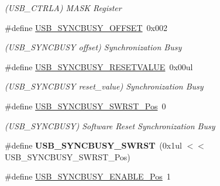 \begin{DoxyCompactItemize}
\begin{DoxyCompactList}\small\item\em (U\+S\+B\+\_\+\+C\+T\+R\+L\+A) M\+A\+S\+K Register \end{DoxyCompactList}\item 
\hypertarget{group___s_a_m_l21___u_s_b_gadc44c2e959eb4402df15e1d094e6978d}{}\#define \hyperlink{group___s_a_m_l21___u_s_b_gadc44c2e959eb4402df15e1d094e6978d}{U\+S\+B\+\_\+\+S\+Y\+N\+C\+B\+U\+S\+Y\+\_\+\+O\+F\+F\+S\+E\+T}~0x002\label{group___s_a_m_l21___u_s_b_gadc44c2e959eb4402df15e1d094e6978d}

\begin{DoxyCompactList}\small\item\em (U\+S\+B\+\_\+\+S\+Y\+N\+C\+B\+U\+S\+Y offset) Synchronization Busy \end{DoxyCompactList}\item 
\hypertarget{group___s_a_m_l21___u_s_b_gafcbd54b32a8e48e80eb02126f810464b}{}\#define \hyperlink{group___s_a_m_l21___u_s_b_gafcbd54b32a8e48e80eb02126f810464b}{U\+S\+B\+\_\+\+S\+Y\+N\+C\+B\+U\+S\+Y\+\_\+\+R\+E\+S\+E\+T\+V\+A\+L\+U\+E}~0x00ul\label{group___s_a_m_l21___u_s_b_gafcbd54b32a8e48e80eb02126f810464b}

\begin{DoxyCompactList}\small\item\em (U\+S\+B\+\_\+\+S\+Y\+N\+C\+B\+U\+S\+Y reset\+\_\+value) Synchronization Busy \end{DoxyCompactList}\item 
\hypertarget{group___s_a_m_l21___u_s_b_ga679838a7b765a2c5a9dfc3fc9b06daf8}{}\#define \hyperlink{group___s_a_m_l21___u_s_b_ga679838a7b765a2c5a9dfc3fc9b06daf8}{U\+S\+B\+\_\+\+S\+Y\+N\+C\+B\+U\+S\+Y\+\_\+\+S\+W\+R\+S\+T\+\_\+\+Pos}~0\label{group___s_a_m_l21___u_s_b_ga679838a7b765a2c5a9dfc3fc9b06daf8}

\begin{DoxyCompactList}\small\item\em (U\+S\+B\+\_\+\+S\+Y\+N\+C\+B\+U\+S\+Y) Software Reset Synchronization Busy \end{DoxyCompactList}\item 
\hypertarget{group___s_a_m_l21___u_s_b_gadaf8d38831c1a8c03a1fc7dad46326e3}{}\#define {\bfseries U\+S\+B\+\_\+\+S\+Y\+N\+C\+B\+U\+S\+Y\+\_\+\+S\+W\+R\+S\+T}~(0x1ul $<$$<$ U\+S\+B\+\_\+\+S\+Y\+N\+C\+B\+U\+S\+Y\+\_\+\+S\+W\+R\+S\+T\+\_\+\+Pos)\label{group___s_a_m_l21___u_s_b_gadaf8d38831c1a8c03a1fc7dad46326e3}

\item 
\hypertarget{group___s_a_m_l21___u_s_b_ga2acb62fc769042bab5332f1ca75ee8bf}{}\#define \hyperlink{group___s_a_m_l21___u_s_b_ga2acb62fc769042bab5332f1ca75ee8bf}{U\+S\+B\+\_\+\+S\+Y\+N\+C\+B\+U\+S\+Y\+\_\+\+E\+N\+A\+B\+L\+E\+\_\+\+Pos}~1\label{group___s_a_m_l21___u_s_b_ga2acb62fc769042bab5332f1ca75ee8bf}


\end{DoxyCompactItemize}
